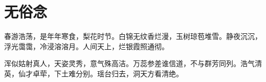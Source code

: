 \chapter{无俗念}

春游浩荡，是年年寒食，梨花时节。白锦无纹香烂漫，玉树琼苞堆雪。静夜沉沉，浮光霭霭，冷浸溶溶月。人间天上，烂银霞照通彻。

浑似姑射真人，天姿灵秀，意气殊高洁。万蕊参差谁信道，不与群芳同列。浩气清英，仙才卓荦，下土难分别。瑶台归去，洞天方看清绝。

